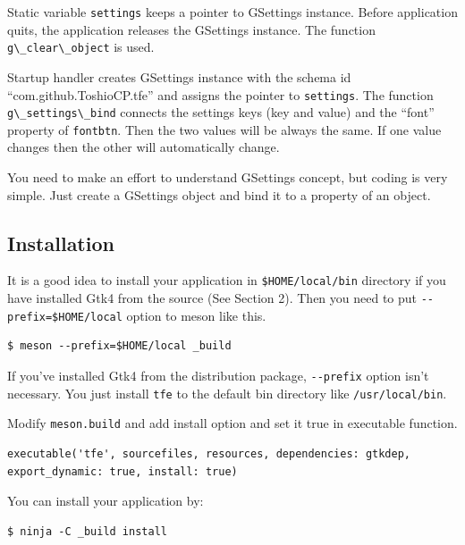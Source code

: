 Static variable \passthrough{\lstinline!settings!} keeps a pointer to
GSettings instance. Before application quits, the application releases
the GSettings instance. The function
\passthrough{\lstinline!g\_clear\_object!} is used.

Startup handler creates GSettings instance with the schema id
``com.github.ToshioCP.tfe'' and assigns the pointer to
\passthrough{\lstinline!settings!}. The function
\passthrough{\lstinline!g\_settings\_bind!} connects the settings keys
(key and value) and the ``font'' property of
\passthrough{\lstinline!fontbtn!}. Then the two values will be always
the same. If one value changes then the other will automatically change.

You need to make an effort to understand GSettings concept, but coding
is very simple. Just create a GSettings object and bind it to a property
of an object.

\hypertarget{installation}{%
\subsection{Installation}\label{installation}}

It is a good idea to install your application in
\passthrough{\lstinline!$HOME/local/bin!} directory if you have
installed Gtk4 from the source (See Section 2). Then you need to put
\passthrough{\lstinline!--prefix=$HOME/local!} option to meson like
this.

\begin{lstlisting}
$ meson --prefix=$HOME/local _build
\end{lstlisting}

If you've installed Gtk4 from the distribution package,
\passthrough{\lstinline!--prefix!} option isn't necessary. You just
install \passthrough{\lstinline!tfe!} to the default bin directory like
\passthrough{\lstinline!/usr/local/bin!}.

Modify \passthrough{\lstinline!meson.build!} and add install option and
set it true in executable function.

\begin{lstlisting}
executable('tfe', sourcefiles, resources, dependencies: gtkdep, export_dynamic: true, install: true)
\end{lstlisting}

You can install your application by:

\begin{lstlisting}
$ ninja -C _build install
\end{lstlisting}

